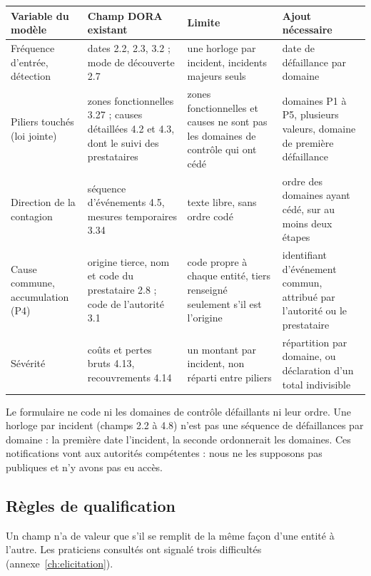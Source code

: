 {\footnotesize
\renewcommand{\arraystretch}{1.25}
\begin{longtable}{@{}>{\raggedright\arraybackslash}p{2.5cm} >{\raggedright\arraybackslash}p{4.0cm} >{\raggedright\arraybackslash}p{3.6cm} >{\raggedright\arraybackslash}p{3.3cm}@{}}
\toprule
\textbf{Variable du modèle} & \textbf{Champ DORA existant} & \textbf{Limite} & \textbf{Ajout nécessaire} \\
\midrule
\endhead
Fréquence d'entrée, détection & dates 2.2, 2.3, 3.2 ; mode de découverte 2.7 & une horloge par incident, incidents majeurs seuls & date de défaillance par domaine \\
Piliers touchés (loi jointe) & zones fonctionnelles 3.27 ; causes détaillées 4.2 et 4.3, dont le suivi des prestataires & zones fonctionnelles et causes ne sont pas les domaines de contrôle qui ont cédé & domaines P1 à P5, plusieurs valeurs, domaine de première défaillance \\
Direction de la contagion & séquence d'événements 4.5, mesures temporaires 3.34 & texte libre, sans ordre codé & ordre des domaines ayant cédé, sur au moins deux étapes \\
Cause commune, accumulation (P4) & origine tierce, nom et code du prestataire 2.8 ; code de l'autorité 3.1 & code propre à chaque entité, tiers renseigné seulement s'il est l'origine & identifiant d'événement commun, attribué par l'autorité ou le prestataire \\
Sévérité & coûts et pertes bruts 4.13, recouvrements 4.14 & un montant par incident, non réparti entre piliers & répartition par domaine, ou déclaration d'un total indivisible \\
\bottomrule
\end{longtable}}

Le formulaire ne code ni les domaines de contrôle défaillants ni leur ordre. Une horloge par incident
(champs 2.2 à 4.8) n'est pas une séquence de défaillances par domaine : la première date l'incident,
la seconde ordonnerait les domaines. Ces notifications vont aux autorités compétentes : nous ne les
supposons pas publiques et n'y avons pas eu accès.

\subsection{Règles de qualification}

Un champ n'a de valeur que s'il se remplit de la même façon d'une entité à l'autre. Les praticiens
consultés ont signalé trois difficultés (annexe~\ref{ch:elicitation}).

